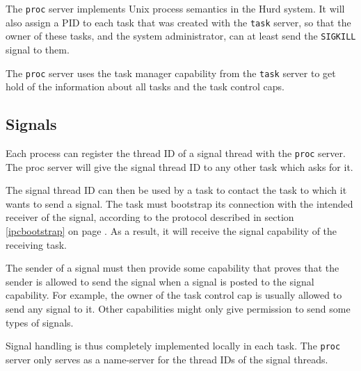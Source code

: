 The \texttt{proc} server implements Unix process semantics in the Hurd
system.  It will also assign a PID to each task that was created with
the \texttt{task} server, so that the owner of these tasks, and the
system administrator, can at least send the \verb/SIGKILL/ signal to
them.

The \texttt{proc} server uses the task manager capability from the
\texttt{task} server to get hold of the information about all tasks
and the task control caps.

\begin{comment}
  The \texttt{proc} server might also be the natural place to
  implement a first policy server for the \texttt{task} server.
\end{comment}


\subsection{Signals}
\label{signals}

Each process can register the thread ID of a signal thread with the
\texttt{proc} server.  The proc server will give the signal thread ID
to any other task which asks for it.

\begin{comment}
  The thread ID can be guessed, so there is no point in protecting it.
\end{comment}

The signal thread ID can then be used by a task to contact the task to
which it wants to send a signal.  The task must bootstrap its
connection with the intended receiver of the signal, according to the
protocol described in section \ref{ipcbootstrap} on page
\pageref{ipcbootstrap}.  As a result, it will receive the signal
capability of the receiving task.

The sender of a signal must then provide some capability that proves
that the sender is allowed to send the signal when a signal is posted
to the signal capability.  For example, the owner of the task control
cap is usually allowed to send any signal to it.  Other capabilities
might only give permission to send some types of signals.

\begin{comment}
  The receiver of the signal decides itself which signals to accept
  from which other tasks.  The default implementation in the C library
  provides POSIX semantics, plus some extensions.
\end{comment}

Signal handling is thus completely implemented locally in each task.
The \texttt{proc} server only serves as a name-server for the thread
IDs of the signal threads.

